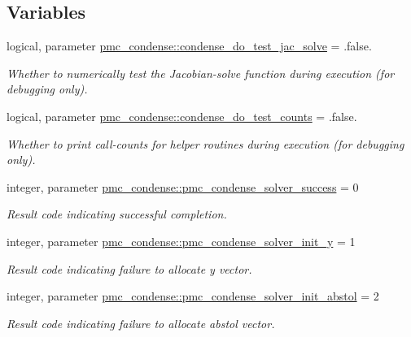 \subsection*{Variables}
\begin{DoxyCompactItemize}
\item 
logical, parameter \mbox{\hyperlink{namespacepmc__condense_ac7de3176ecbf47a23e0278ff57fed802}{pmc\+\_\+condense\+::condense\+\_\+do\+\_\+test\+\_\+jac\+\_\+solve}} = .false.
\begin{DoxyCompactList}\small\item\em Whether to numerically test the Jacobian-\/solve function during execution (for debugging only). \end{DoxyCompactList}\item 
logical, parameter \mbox{\hyperlink{namespacepmc__condense_ab969e806479179fa28b147414b3677a1}{pmc\+\_\+condense\+::condense\+\_\+do\+\_\+test\+\_\+counts}} = .false.
\begin{DoxyCompactList}\small\item\em Whether to print call-\/counts for helper routines during execution (for debugging only). \end{DoxyCompactList}\item 
integer, parameter \mbox{\hyperlink{namespacepmc__condense_ae609c2a0547a2fc09bb22c5e05eaee80}{pmc\+\_\+condense\+::pmc\+\_\+condense\+\_\+solver\+\_\+success}} = 0
\begin{DoxyCompactList}\small\item\em Result code indicating successful completion. \end{DoxyCompactList}\item 
integer, parameter \mbox{\hyperlink{namespacepmc__condense_a361258031530fbffce78f9296be23482}{pmc\+\_\+condense\+::pmc\+\_\+condense\+\_\+solver\+\_\+init\+\_\+y}} = 1
\begin{DoxyCompactList}\small\item\em Result code indicating failure to allocate {\ttfamily y} vector. \end{DoxyCompactList}\item 
integer, parameter \mbox{\hyperlink{namespacepmc__condense_a27e346e39aa2e4388fb4cdb05009d947}{pmc\+\_\+condense\+::pmc\+\_\+condense\+\_\+solver\+\_\+init\+\_\+abstol}} = 2
\begin{DoxyCompactList}\small\item\em Result code indicating failure to allocate {\ttfamily abstol} vector. \end{DoxyCompactList}\item 

\end{DoxyCompactItemize}
